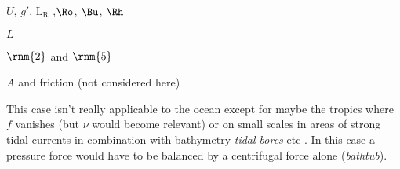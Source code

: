 \begin{eddy} \label{eddy:tornado}
\begin{description}
\item[large:]\hspace{50 pt}
$U$, $g'$, $\mathrm{L_R}$ ,$\Ro$, $\Bu$, $\Rh$
\item[small:]\hspace{50 pt}
$L$
\item[balance between:]
$\rnm{2}$ and $\rnm{5}$
\item[significant vorticity term:]
$A$ and friction (not considered here)
\end{description}\vspace{2pt}
This case isn't really applicable to the ocean except for maybe the tropics where $f$ vanishes (but $\nu$ would become relevant) or on small scales in areas of strong tidal currents in combination with bathymetry \ie \textit{tidal bores} etc . In this case a pressure force would have to be balanced by a centrifugal force alone (\eg \textit{bathtub}).
\end{eddy}






